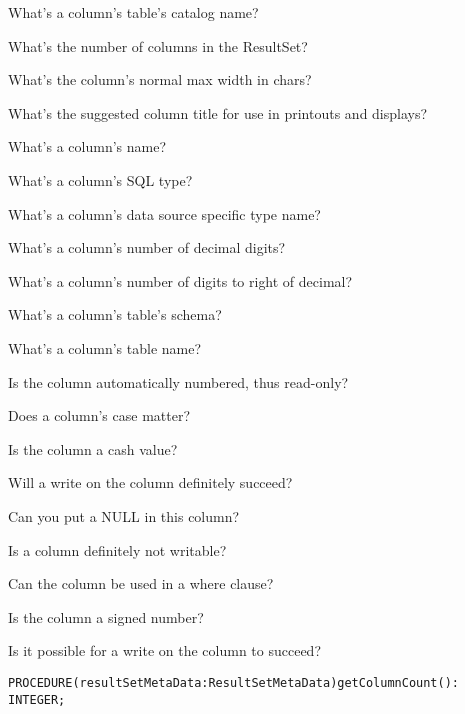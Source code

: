 \begin{description}
  What's a column's table's catalog name? 

  What's the number of columns in the ResultSet? 

  What's the column's normal max width in chars? 

What's the suggested column title for use in printouts and displays? 

What's a column's name? 

What's a column's SQL type? 

What's a column's data source specific type name? 

What's a column's number of decimal digits? 

What's a column's number of digits to right of decimal? 

What's a column's table's schema? 

What's a column's table name? 

Is the column automatically numbered, thus read-only? 

Does a column's case matter? 

Is the column a cash value? 

Will a write on the column definitely succeed? 

Can you put a NULL in this column? 

Is a column definitely not writable? 

Can the column be used in a where clause? 

Is the column a signed number? 

Is it possible for a write on the column to succeed? 

\end{description}



\verb'PROCEDURE(resultSetMetaData:ResultSetMetaData)getColumnCount(): INTEGER;'

